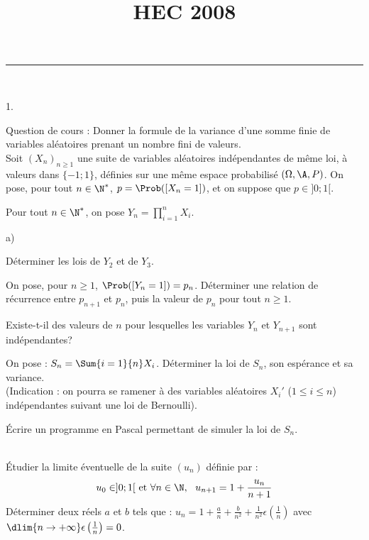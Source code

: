 \documentclass[11pt]{article}%
\title{\bf \vspace{-1.6cm} HEC 2008} %
\author{} %
\date{} %
\begin{document}
\maketitle %
\vspace{-1.2cm}\hrule %
\thispagestyle{fancy}

\vspace*{.2cm}


\begin{exerciceAP}~
  \begin{noliste}{1.}
    \setlength{\itemsep}{2mm}
  \item Question de cours : Donner la formule de la variance d'une
    somme finie de variables aléatoires prenant un nombre fini de
    valeurs.
    \\[.2cm]
    Soit $(X_n)_{n \geq 1}$ une suite de variables aléatoires
    indépendantes de même loi, à valeurs dans $\{-1 ; 1\}$, définies
    sur une même espace probabilisé $(\Omega , \A , P)$. On pose, pour
    tout $n \in \N^*$, $p = \Prob([X_n = 1])$, et on suppose que $p
    \in ] 0 ; 1[$.
  \item Pour tout $n \in \N^*$, on pose $Y_n = \prod\limits_{i=1}^n X_i$.
    \begin{noliste}{a)}
    \setlength{\itemsep}{2mm}
    \item Déterminer les lois de $Y_2$ et de $Y_3$.
    \item On pose, pour $n \geq 1$, $\Prob([Y_n = 1]) =
      p_n$. Déterminer une relation de récurrence entre $p_{n+1}$ et
      $p_n$, puis la valeur de $p_n$ pour tout $n \geq 1$.
    \item Existe-t-il des valeurs de $n$ pour lesquelles les variables
      $Y_n$ et $Y_{n+1}$ sont indépendantes?
    \end{noliste}
  \item On pose : $S_n = \Sum{i=1}{n} X_i$. Déterminer la loi de
    $S_n$, son espérance et sa variance. \\
    (Indication : on pourra se ramener à des variables aléatoires
    $X_i'$ ($1 \leq i \leq n$) indépendantes suivant une loi de
    Bernoulli).
  \item Écrire un programme en Pascal permettant de simuler la loi de $S_n$. \\
  \end{noliste}
\end{exerciceAP}


\begin{exerciceSP}~\\
  Étudier la limite éventuelle de la suite $(u_n)$ définie par :
  \[
  u_0 \in ] 0 ; 1[ \text{ et } \forall n \in \N,\ \ u_{n+1} = 1 +
  \frac{u_n}{n+1}
 \]
 Déterminer deux réels $a$ et $b$ tels que : $u_n = 1 + \frac{a}{n} +
 \frac{b}{n^2} + \frac{1}{n^2} \epsilon \left( \frac{1}{n} \right)$
 avec $\dlim{n \rightarrow +\infty} \epsilon \left( \frac{1}{n}
 \right) = 0$.
\end{exerciceSP}
\end{document}
